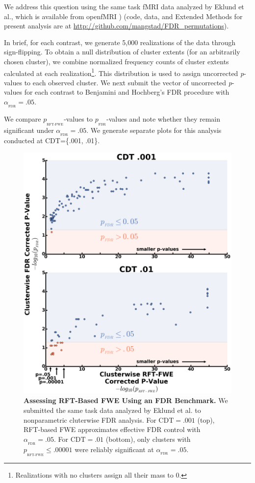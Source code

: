 \documentclass[letterpaper]{article}
\newcommand{\subtext}[2]{
#1_{_{\text{#2}}}
}
\begin{document}
We address this question using the same task fMRI data \cite{duncan_consistency_2009,tom_neural_2007} analyzed by Eklund et al., which is available from openfMRI \cite{poldrack_toward_2013})  (code, data, and Extended Methods for present analysis are at \url{http://github.com/mangstad/FDR_permutations}).

In brief, for each contrast, we generate 5,000 realizations of the data through sign-flipping. 
To obtain a null distribution of cluster extents (for an arbitrarily chosen cluster), we combine normalized frequency counts of cluster extents calculated at each realization\footnote{Realizations with no clusters assign all their mass to 0.}. 
This distribution is used to assign uncorrected \textit{p}-values to each observed cluster. 
We next submit the vector of uncorrected \textit{p}-values for each contrast to Benjamini and Hochberg's \cite{fdr} FDR procedure with $\subtext{\alpha}{FDR}=.05$.
 
We compare $\subtext{p}{RFT-FWE}$-values to $\subtext{p}{FDR}$-values and note whether they remain significant under $\subtext{\alpha}{FDR}=.05$. 
We generate separate plots for this analysis conducted at CDT=\{.001, .01\}.

\begin{figure}[ht]
\includegraphics[width=1.0\textwidth]{plot}
\centering
\caption{
\textbf{Assessing RFT-Based FWE Using an FDR Benchmark.}
We submitted the same task data analyzed by Eklund et al. to nonparametric cluterwise FDR analysis. For $\text{CDT}=.001$ (top), RFT-based FWE approximates effective FDR control with $\subtext{\alpha}{FDR} = .05$. For $\text{CDT}=.01$ (bottom), only clusters with $\subtext{p}{RFT-FWE} \leq .00001$ were reliably significant at $\subtext{\alpha}{FDR}=.05$. 
\label{fig:p-plot}
}
\end{figure} 
\end{document}
